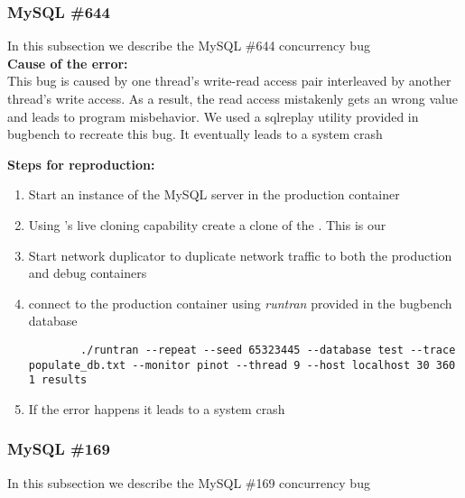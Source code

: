 \subsubsection{MySQL \#644}

In this subsection we describe the MySQL \#644 concurrency bug \\

\noindent \textbf{Cause of the error:} \\

This bug is caused by one thread's write-read access pair interleaved by another thread's write access. 
As a result, the read access mistakenly gets an wrong value and leads to program misbehavior.
We used a sqlreplay utility provided in bugbench to recreate this bug. It eventually leads to a system crash

\noindent \textbf{Steps for reproduction:} \\

\begin{adjustwidth}{0.5cm}{}
	\begin{enumerate}
		\item Start an instance of the MySQL server in the production container
		\item Using \parikshan's live cloning capability create a clone of the \productioncontainer. This is our \debugcontainer
		\item Start network duplicator to duplicate network traffic to both the production and debug containers
		\item connect to the production container using \emph{runtran} provided in the bugbench database
		
		\begin{lstlisting}
		./runtran --repeat --seed 65323445 --database test --trace populate_db.txt --monitor pinot --thread 9 --host localhost 30 360 1 results
		\end{lstlisting}
		
		\item If the error happens it leads to a system crash
		
	\end{enumerate}
\end{adjustwidth}	


\subsubsection{MySQL \#169}

In this subsection we describe the MySQL \#169 concurrency bug \\


